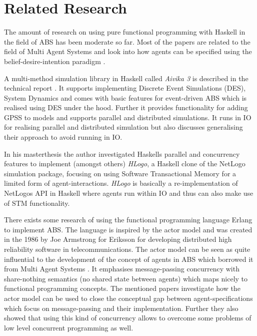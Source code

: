 \section{Related Research}
The amount of research on using pure functional programming with Haskell in the field of ABS has been moderate so far. Most of the papers are related to the field of Multi Agent Systems and look into how agents can be specified using the belief-desire-intention paradigm \cite{de_jong_suitability_2014, sulzmann_specifying_2007, jankovic_functional_2007}.

A multi-method simulation library in Haskell called \textit{Aivika 3} is described in the technical report \cite{sorokin_aivika_2015}. It supports implementing Discrete Event Simulations (DES), System Dynamics and comes with basic features for event-driven ABS which is realised using DES under the hood. Further it provides functionality for adding GPSS to models and supports parallel and distributed simulations. It runs in IO for realising parallel and distributed simulation but also discusses generalising their approach to avoid running in IO.

In his masterthesis \cite{bezirgiannis_improving_2013} the author investigated Haskells parallel and concurrency features to implement (amongst others) \textit{HLogo}, a Haskell clone of the NetLogo simulation package, focusing on using Software Transactional Memory for a limited form of agent-interactions. \textit{HLogo} is basically a re-implementation of NetLogos API in Haskell where agents run within IO and thus can also make use of STM functionality.

There exists some research \cite{di_stefano_using_2005, varela_modelling_2004, sher_agent-based_2013} of using the functional programming language Erlang \cite{armstrong_erlang_2010} to implement ABS. The language is inspired by the actor model \cite{agha_actors:_1986} and was created in the 1986 by Joe Armstrong for Eriksson for developing distributed high reliability software in telecommunications. The actor model can be seen as quite influential to the development of the concept of agents in ABS which borrowed it from Multi Agent Systems \cite{wooldridge_introduction_2009}. It emphasises message-passing concurrency with share-nothing semantics (no shared state between agents) which maps nicely to functional programming concepts. The mentioned papers investigate how the actor model can be used to close the conceptual gap between agent-specifications which focus on message-passing and their implementation. Further they also showed that using this kind of concurrency allows to overcome some problems of low level concurrent programming as well.

